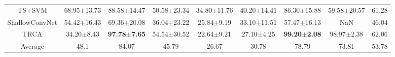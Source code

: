 \begin{adjustbox}{scale=.7}
\begin{tabular}{c|ccccccc|c}
    \rowcolor{YellowOrange!10} TS+SVM &                   68.95$\pm$13.73 &                  88.58$\pm$14.47 &                   50.58$\pm$23.34 &                   34.80$\pm$11.76 &                   40.20$\pm$14.41 &                  86.30$\pm$15.88 & 59.58$\pm$20.57 &          61.28 \\
    \rowcolor{YellowOrange!20} ShallowConvNet &                   54.42$\pm$16.43 &                  69.36$\pm$20.08 &                   36.04$\pm$23.22 &                    25.84$\pm$9.19 &                   33.10$\pm$11.51 &                  57.47$\pm$16.13 &             NaN &          46.04 \\
    \rowcolor{YellowOrange!10} TRCA &                    34.20$\pm$8.43 & \textbf{97.78}$\pm$\textbf{7.65} &                   54.54$\pm$30.52 &                    22.64$\pm$9.21 &                    27.10$\pm$4.25 & \textbf{99.20}$\pm$\textbf{2.08} &  98.97$\pm$2.38 &          62.06 \\
    \hline 
    \rowcolor{YellowOrange!50} Average &                              48.1 &                            84.07 &                             45.79 &                             26.67 &                             30.78 &                            78.79 &           73.81 &          53.78 \\
    \hline
\end{tabular}\end{adjustbox}
